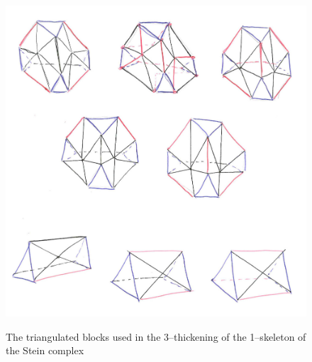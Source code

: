 \begin{figure}
	\centering
	\captionsetup{justification=centering}
	\caption{The triangulated blocks used in the 3--thickening of the 1--skeleton of the Stein complex}
	\includegraphics[width=5in]{figures/3thicktri.jpg}
	\label{fig:3thicktri}
\end{figure}